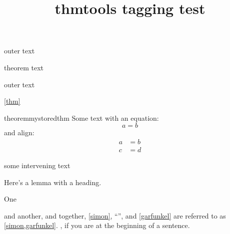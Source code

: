 \documentclass{article}
\title{thmtools tagging test}
\begin{document}
\listoftheorems

outer text

\begin{theorem}\label{thm}
theorem text
\end{theorem}

outer text

\autoref{thm}

\begin{restatable}{theorem}{mystoredthm}
Some text with an equation:
\begin{equation}
a=b
\end{equation}
and align:
\begin{align}
a &= b \\
c &= d
\end{align}
\end{restatable}

some intervening text

\begin{lemma}[heading] %
Here's a lemma with a heading.
\end{lemma}

\mystoredthm*

\begin{callmeal}[Simon]\label{simon}
One
\end{callmeal}
\begin{callmeal}\label{garfunkel}
and another, and together,
\autoref{simon}, ``'',
and \cref{garfunkel} are referred
to as \cref{simon,garfunkel}.
, if you are at
the beginning of a sentence.
\end{callmeal}
\end{document}
